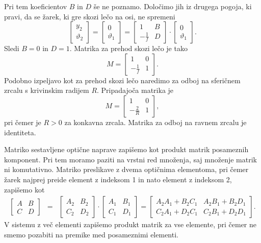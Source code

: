 Pri tem koeficientov $B$ in $D$ še ne poznamo. Določimo jih iz drugega pogoja, 
ki pravi, da se žarek, ki gre skozi lečo na osi, ne spremeni
\begin{equation}
\left[\begin{array}{c}
y_{2}\\
\vartheta_{2}
\end{array}\right]=\left[\begin{array}{c}
0\\
\vartheta_{1}
\end{array}\right]=\left[\begin{array}{cc}
1 & B\\
-\frac{1}{f} & D
\end{array}\right]\cdot\left[\begin{array}{c}
0\\
\vartheta_{1}
\end{array}\right].
\end{equation}
 Sledi $B=0$ in $D=1$. Matrika za prehod skozi lečo je tako 
\begin{equation}
M= \left[\begin{array}{cc}
1 & 0\\
-\frac{1}{f} & 1
\end{array}\right].
\end{equation}
Podobno izpeljavo kot za prehod skozi lečo naredimo za odboj na sferičnem zrcalu
s krivinskim radijem $R$. Pripadajoča matrika je 
\begin{equation}
M=\left[\begin{array}{cc}
1 & 0\\
-\frac{2}{R} & 1
\end{array}\right],
\end{equation}
pri čemer je $R>0$ za konkavna zrcala. Matrika za odboj na ravnem zrcalu je identiteta.

Matriko sestavljene optične naprave zapišemo kot produkt matrik posameznih komponent. 
Pri tem moramo paziti na vrstni red množenja, saj množenje matrik ni komutativno.
Matriko preslikave z dvema optičnima elementoma, pri čemer žarek 
najprej preide element z indeksom 1 in nato element z indeksom 2, zapišemo kot 
\begin{eqnarray}
\left[\begin{array}{cc}
A & B\\
C & D
\end{array}\right] & = & \left[\begin{array}{cc}
A_{2} & B_{2}\\
C_{2} & D_{2}
\end{array}\right]\cdot\left[\begin{array}{cc}
A_{1} & B_{1}\\
C_{1} & D_{1}
\end{array}\right]=\left[\begin{array}{cc}
A_{2}A_{1}+B_{2}C_{1} & A_{2}B_{1}+B_{2}D_{1}\\
C_{2}A_{1}+D_{2}C_{1} & C_{2}B_{1}+D_{2}D_{1}
\end{array}\right].
\end{eqnarray}
V sistemu z več elementi zapišemo produkt matrik za vse elemente, 
pri čemer ne smemo pozabiti na premike med posameznimi elementi.


